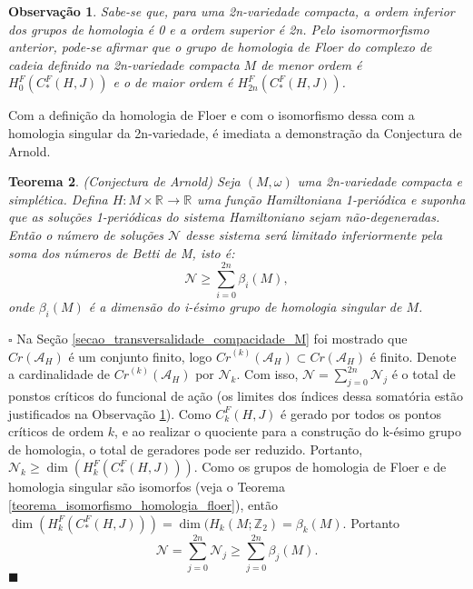 \documentclass[12pt]{book}
\newtheorem{teorema}{Teorema}[section]
\newtheorem{observacao}[teorema]{Observação}
\newenvironment{prova}[1]{$\square$ #1}{\hfill$\blacksquare$}
\newcommand{\funcionalH}{\mathcal{A}_{H}}
\newcommand{\inteiros}{\mathbb{Z}}
\newcommand{\pontoscriticos}[1]{\textit{Cr}(#1)}
\newcommand{\pontoscriticosordem}[2]{\textit{Cr}^{(#1)}(#2)}
\newcommand{\real}[1]{\mathbb{R}^{#1}}
\newcommand{\reta}{\real{}}
\begin{document}
	\begin{observacao}\label{observacao_ordem_homologia_floer}
		Sabe-se que, para uma 2n-variedade compacta, a ordem inferior dos grupos de homologia é 0 e a ordem superior é 2n. Pelo isomormorfismo anterior, pode-se afirmar que o grupo de homologia de Floer do complexo de cadeia definido na 2n-variedade compacta $M$ de menor ordem é $	H^{F}_{0}(C^{F}_{*}(H,J))$ e o de maior ordem é $H^{F}_{2n}(C^{F}_{*}(H,J))$.
	\end{observacao}
	
	Com a definição da homologia de Floer e com o isomorfismo dessa com a homologia singular da 2n-variedade, é imediata a demonstração da Conjectura de Arnold.
	
	\begin{teorema}
			(Conjectura de Arnold) Seja $(M,\omega)$ uma 2n-variedade compacta e simplética. Defina $H:M\times \real{} \to \reta$ uma função Hamiltoniana 1-periódica e suponha que as soluções 1-periódicas do sistema Hamiltoniano sejam não-degeneradas. Então o número de soluções $\mathcal{N}$ desse sistema será limitado inferiormente pela soma dos números de Betti de M, isto é:
				$$
				\mathcal{N}\geq \sum_{i=0}^{2n}\beta_{i}(M),
				$$
				onde $\beta_{i}(M)$ é a dimensão do i-ésimo grupo de homologia singular de $M$.
	\end{teorema}
	\begin{prova}
		Na Seção \ref{secao_transversalidade_compacidade_M} foi mostrado que $\pontoscriticos{\funcionalH}$ é um conjunto finito, logo $\pontoscriticosordem{k}{\funcionalH} \subset \pontoscriticos{\funcionalH}$ é finito. Denote a cardinalidade de $\pontoscriticosordem{k}{\funcionalH}$ por $\mathcal{N}_{k}$. Com isso, $\mathcal{N} =\sum_{j=0}^{2n} \mathcal{N}_{j}$ é o total de ponstos críticos do funcional de ação (os limites dos índices dessa somatória estão justificados na Observação \ref{observacao_ordem_homologia_floer}). Como $C^{F}_{k}(H,J)$ é gerado por todos os pontos críticos de ordem $k$, e ao realizar o quociente para a construção do k-ésimo grupo de homologia, o total de geradores pode ser reduzido. Portanto, $\mathcal{N}_{k}\geq \dim(	H^{F}_{k}(C^{F}_{*}(H,J)))$. Como os grupos de homologia de Floer e de homologia singular são isomorfos (veja o Teorema \ref{teorema_isomorfismo_homologia_floer}), então $\dim(	H^{F}_{k}(C^{F}_{*}(H,J)))  = \dim(	H_{k}(M;\inteiros_{2}) = \beta_{k}(M)$. Portanto
		$$
		\mathcal{N} =\sum_{j=0}^{2n} \mathcal{N}_{j} \geq \sum_{j=0}^{2n} \beta_{j}(M).
		$$ 
	\end{prova}
	
\end{document}
